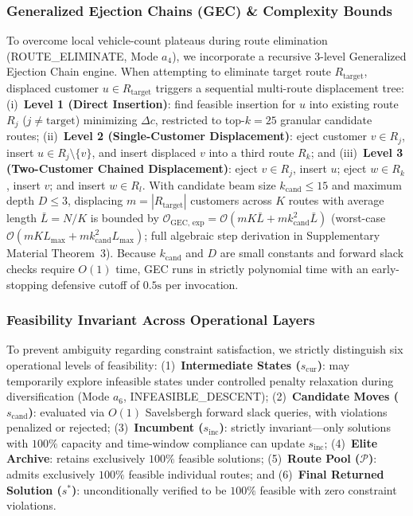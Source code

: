 \documentclass{ieeeaccess}
\begin{document}
\subsubsection{Generalized Ejection Chains (GEC) \& Complexity Bounds}
\label{sec:gec_methodology}
To overcome local vehicle-count plateaus during route elimination (\textsf{\small ROUTE\_\allowbreak ELIMINATE}, Mode $a_4$), we incorporate a recursive 3-level Generalized Ejection Chain engine. When attempting to eliminate target route $R_{\text{target}}$, displaced customer $u \in R_{\text{target}}$ triggers a sequential multi-route displacement tree: (i)~\textbf{Level 1 (Direct Insertion)}: find feasible insertion for $u$ into existing route $R_j$ ($j \neq \text{target}$) minimizing $\Delta c$, restricted to top-$k=25$ granular candidate routes; (ii)~\textbf{Level 2 (Single-Customer Displacement)}: eject customer $v \in R_j$, insert $u \in R_j \setminus \{v\}$, and insert displaced $v$ into a third route $R_k$; and (iii)~\textbf{Level 3 (Two-Customer Chained Displacement)}: eject $v \in R_j$, insert $u$; eject $w \in R_k$, insert $v$; and insert $w \in R_l$.
With candidate beam size $k_{\text{cand}} \le 15$ and maximum depth $D \le 3$, displacing $m = |R_{\text{target}}|$ customers across $K$ routes with average length $\bar{L} = N/K$ is bounded by $\mathcal{O}_{\text{GEC, exp}} = \mathcal{O}(m K \bar{L} + m k_{\text{cand}}^2 \bar{L})$ (worst-case $\mathcal{O}(m K L_{\max} + m k_{\text{cand}}^2 L_{\max})$; full algebraic step derivation in Supplementary Material Theorem~3). Because $k_{\text{cand}}$ and $D$ are small constants and forward slack checks require $O(1)$ time, GEC runs in strictly polynomial time with an early-stopping defensive cutoff of $0.5\text{s}$ per invocation.

\subsubsection{Feasibility Invariant Across Operational Layers}
\label{sec:feasibility_invariant}
To prevent ambiguity regarding constraint satisfaction, we strictly distinguish six operational levels of feasibility: (1)~\textbf{Intermediate States ($s_{\text{cur}}$)}: may temporarily explore infeasible states under controlled penalty relaxation during diversification (Mode $a_6$, \textsf{\small INFEASIBLE\_DESCENT}); (2)~\textbf{Candidate Moves ($s_{\text{cand}}$)}: evaluated via $O(1)$ Savelsbergh forward slack queries, with violations penalized or rejected; (3)~\textbf{Incumbent ($s_{\text{inc}}$)}: strictly invariant---only solutions with $100\%$ capacity and time-window compliance can update $s_{\text{inc}}$; (4)~\textbf{Elite Archive}: retains exclusively $100\%$ feasible solutions; (5)~\textbf{Route Pool ($\mathcal{P}$)}: admits exclusively $100\%$ feasible individual routes; and (6)~\textbf{Final Returned Solution ($s^*$)}: unconditionally verified to be $100\%$ feasible with zero constraint violations.
\end{document}
